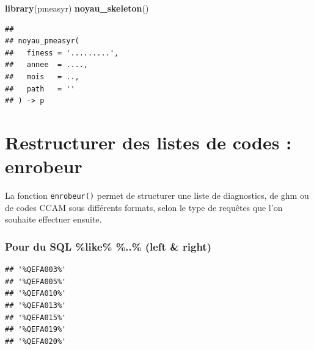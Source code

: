\documentclass[]{book}
\newenvironment{Shaded}{\begin{snugshade}}{\end{snugshade}}
\newcommand{\KeywordTok}[1]{\textcolor[rgb]{0.13,0.29,0.53}{\textbf{#1}}}
\newcommand{\DataTypeTok}[1]{\textcolor[rgb]{0.13,0.29,0.53}{#1}}
\newcommand{\CharTok}[1]{\textcolor[rgb]{0.31,0.60,0.02}{#1}}
\newcommand{\StringTok}[1]{\textcolor[rgb]{0.31,0.60,0.02}{#1}}
\newcommand{\OperatorTok}[1]{\textcolor[rgb]{0.81,0.36,0.00}{\textbf{#1}}}
\newcommand{\NormalTok}[1]{#1}
\theoremstyle{definition}
\theoremstyle{definition}
\theoremstyle{definition}
\theoremstyle{remark}
\begin{document}
\begin{Shaded}
\begin{Highlighting}[]
\KeywordTok{library}\NormalTok{(pmeasyr)}
\KeywordTok{noyau_skeleton}\NormalTok{()}
\end{Highlighting}
\end{Shaded}

\begin{verbatim}
## 
## noyau_pmeasyr(
##   finess = '.........',
##   annee  = ....,
##   mois   = ..,
##   path   = ''
## ) -> p
\end{verbatim}

\chapter{Restructurer des listes de codes :
enrobeur}\label{restructurer-des-listes-de-codes-enrobeur}

La fonction \texttt{enrobeur()} permet de structurer une liste de
diagnostics, de ghm ou de codes CCAM sous différents formats, selon le
type de requêtes que l'on souhaite effectuer ensuite.

\subsection{Pour du SQL \%like\% \%..\% (left \&
right)}\label{pour-du-sql-like-..-left-right}

\begin{Shaded}
\end{Shaded}

\begin{verbatim}
## '%QEFA003%'
## '%QEFA005%'
## '%QEFA010%'
## '%QEFA013%'
## '%QEFA015%'
## '%QEFA019%'
## '%QEFA020%'
\end{verbatim}
\end{document}
